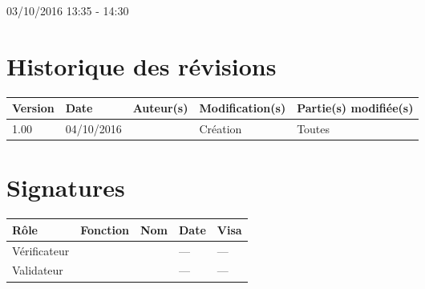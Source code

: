 \documentclass [a4paper] {article}
\begin{document}
03/10/2016			 				%
\hfill   
\hfill 	 13:35 - 14:30				%


\section*{Historique des révisions}
\begin{center}
			\begin{tabular}{| p{2.5cm} | p{3cm} | p{3cm} | p{3cm} | p{3.5cm} |}
				\hline
				\rowcolor{Gray}
				Version & Date & Auteur(s) & Modification(s) & Partie(s) modifiée(s)		 \\
				\hline
				1.00 & 04/10/2016 & \Kafui & Création & Toutes \\
				\hline			
			\end{tabular}
		\end{center}

\section*{Signatures}

		\begin{center}
			\begin{tabular}{| p{2.5cm} | p{4cm} | p{3cm} | p{3cm} | p{2.5cm} |}
				\hline
				\rowcolor{Gray}
				Rôle & Fonction & Nom & Date & Visa		 \\
				\hline
				Vérificateur & \RGC & \Melissa & --- & --- \\[30pt]
				\hline
				Validateur & \CP & \Pierre &  --- & --- \\[30pt]	
				\hline
			\end{tabular}
		\end{center}

\end{document}
